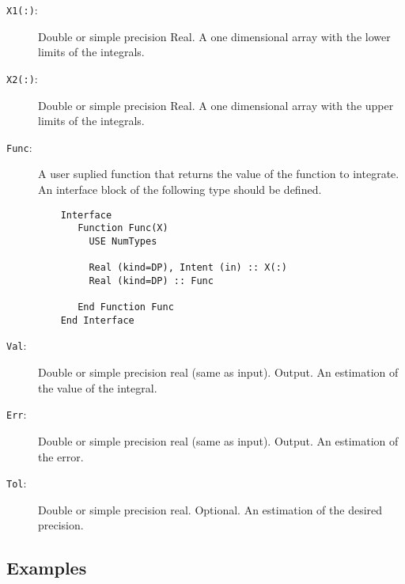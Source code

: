 \begin{description}
\item[\texttt{X1(:)}:] Double or simple precision Real. A one dimensional
  array with the lower limits of the integrals.
\item[\texttt{X2(:)}:] Double or simple precision Real. A one dimensional
  array with the upper limits of the integrals.
\item[\texttt{Func}: ] A user suplied function that returns the value
  of the function to integrate. An interface block of the following
  type should be defined. 
\begin{verbatim}
    Interface 
       Function Func(X)
         USE NumTypes
         
         Real (kind=DP), Intent (in) :: X(:)
         Real (kind=DP) :: Func

       End Function Func
    End Interface
\end{verbatim}
\item[\texttt{Val}: ] Double or simple precision real (same as
  input). Output. An estimation of the value of the integral.
\item[\texttt{Err}: ] Double or simple precision real (same as
  input). Output. An estimation of the error.
\item[\texttt{Tol}: ] Double or simple precision real. Optional. An
  estimation of the desired precision.
\end{description}

\subsection{Examples}

